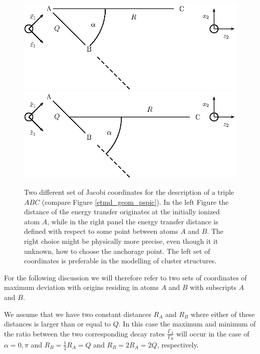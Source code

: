 \begin{figure}
 \centering
 \includegraphics[scale=0.6]{pics/coord_etmd_alt_pspic.eps}
 \hfill
 \includegraphics[scale=0.6]{pics/coord_etmd_pspic.eps}
 \caption{Two different set of Jacobi coordinates for the description of a triple
          $ABC$ (compare Figure \ref{etmd_geom_pspic}).
          In the left Figure the distance of the energy transfer originates
          at the initially ionized atom $A$, while in the right panel the
          energy transfer distance is defined with respect to some
          point between atoms $A$ and $B$. The right choice might be
          physically more precise, even though it it unknown, how to choose
          the anchorage point. The left set of coordinates is preferable
          in the modelling of cluster structures.}
 \label{figure:coord_etmd_comparison}
\end{figure}

For the following discussion we will therefore refer to two sets
of coordinates of maximum deviation with origins residing in atoms
$A$ and $B$ with subscripts $A$ and $B$.

We assume that we have two constant distances $R_{A}$ and $R_B$
where either of these distances is larger than or equal to $Q$.
In this case the maximum and minimum of the ratio between the two
corresponding decay rates $\frac{\Gamma_{A}}{\Gamma_B}$ will occur
in the case of $\alpha = 0,\pi$ and $R_B = \frac 12 R_{A} = Q$
and $R_B = 2 R_{A} = 2Q$, respectively.

